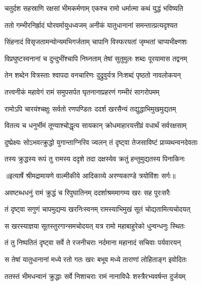 \twolineshloka
{चतुर्दश सहस्राणि रक्षसां भीमकर्मणाम्}
{एकश्च रामो धर्मात्मा कथं युद्धं भविष्यति} %

\twolineshloka
{ततो गम्भीरनिर्ह्रादं घोरवर्मायुधध्वजम्}
{अनीकं यातुधानानां समन्तात्प्रत्यदृश्यत} %

\twolineshloka
{सिंहनादं विसृजतामन्योन्यमभिगर्जताम्}
{चापानि विस्फरयतां जृम्भतां चाप्यभीक्ष्णशः} %

\twolineshloka
{विप्रघुष्टस्वनानां च दुन्दुभींश्चापि निघ्नताम्}
{तेषां सुतुमुलः शब्दः पूरयामास तद्वनम्} %

\twolineshloka
{तेन शब्देन वित्रस्ताः श्वापदा वनचारिणः}
{दुद्रुवुर्यत्र निःशब्दं पृष्ठतो नावलोकयन्} %

\twolineshloka
{तत्त्वनीकं महावेगं रामं समुपसर्पत}
{घृतनानाप्रहरणं गम्भीरं सागरोपमम्} %

\twolineshloka
{रामोऽपि चारयंश्चक्षुः सर्वतो रणपण्डितः}
{ददर्श खरसैन्यं तद्युद्धाभिमुखमुद्यतम्} %

\twolineshloka
{वितत्य च धनुर्भीमं तूण्याश्चोद्धृत्य सायकान्}
{क्रोधमाहारयत्तीव्रं वधार्थं सर्वरक्षसाम्} %

\twolineshloka
{दुष्प्रेक्ष्यः सोऽभवत्क्रुद्धो युगान्ताग्निरिव ज्वलन्}
{तं दृष्ट्वा तेजसाविष्टं प्राव्यथन्वनदेवताः} %

\twolineshloka
{तस्य क्रुद्धस्य रूपं तु रामस्य ददृशे तदा}
{दक्षस्येव क्रतुं हन्तुमुद्यतस्य पिनाकिनः} %


{॥इत्यार्षे श्रीमद्रामायणे वाल्मीकीये आदिकाव्ये अरण्यकाण्डे त्रयोविंशः सर्गः॥}


\twolineshloka
{अवष्टब्धधनुं रामं क्रुद्धं च रिपुघातिनम्}
{ददर्शाश्रममागम्य खरः सह पुरःसरैः} %

\twolineshloka
{तं दृष्ट्वा सगुणं चापमुद्यम्य खरनिःस्वनम्}
{रामस्याभिमुखं सूतं चोद्यतामित्यचोदयत्} %

\twolineshloka
{स खरस्याज्ञया सूतस्तुरगान्समचोदयत्}
{यत्र रामो महाबाहुरेको धुन्वन्धनुः स्थितः} %

\twolineshloka
{तं तु निष्पतितं दृष्ट्वा सर्वे ते रजनीचराः}
{नर्दमाना महानादं सचिवाः पर्यवारयन्} %

\twolineshloka
{स तेषां यातुधानानां मध्ये रतो गतः खरः}
{बभूव मध्ये ताराणां लोहिताङ्ग इवोदितः} %

\twolineshloka
{ततस्तं भीमधन्वानं क्रुद्धाः सर्वे निशाचराः}
{रामं नानाविधैः शस्त्रैरभ्यवर्षन्त दुर्जयम्} %


